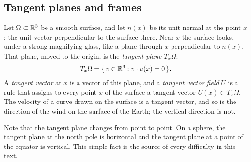 \subsection{Tangent planes and frames}

Let $\Omega \subset \mathbb{R}^3$ be a smooth surface, and let $n(x)$ be its unit normal at the point $x$: the unit vector perpendicular to the surface there. Near $x$ the surface looks, under a strong magnifying glass, like a plane through $x$ perpendicular to $n(x)$. That plane, moved to the origin, is the \emph{tangent plane} $T_x \Omega$:
\begin{equation*}
T_x\Omega = \{\, v \in \mathbb{R}^3 : v \cdot n(x) = 0 \,\}.
\end{equation*}
A \emph{tangent vector} at $x$ is a vector of this plane, and a \emph{tangent vector field} $U$ is a rule that assigns to every point $x$ of the surface a tangent vector $U(x) \in T_x \Omega$. The velocity of a curve drawn on the surface is a tangent vector, and so is the direction of the wind on the surface of the Earth; the vertical direction is not.

Note that the tangent plane changes from point to point. On a sphere, the tangent plane at the north pole is horizontal and the tangent plane at a point of the equator is vertical. This simple fact is the source of every difficulty in this text.

